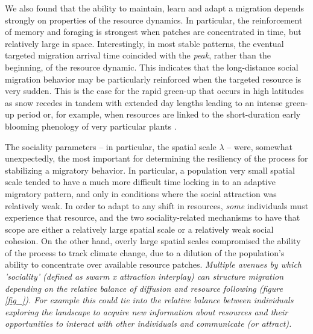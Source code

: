 \documentclass[utf8]{frontiersSCNS} %
\begin{document}
We also found that the ability to maintain, learn and adapt a migration depends strongly on properties of the resource dynamics. In particular, the reinforcement of memory and foraging is strongest when patches are concentrated in time, but relatively large in space. Interestingly, in most stable patterns, the eventual targeted migration arrival time coincided with the \emph{peak}, rather than the beginning, of the resource dynamic. This indicates that the long-distance social migration behavior may be particularly reinforced when the targeted resource is very sudden. This is the case for the rapid green-up that occurs in high latitudes as snow recedes in tandem with extended day lengths leading to an intense green-up period \citep{Park2020} or, for example, when resources are linked to the short-duration early blooming phenology of very particular plants \citep{Post2007}. 

The sociality parameters -- in particular, the spatial scale $\lambda$ -- were, somewhat unexpectedly, the most important for determining the resiliency of the process for stabilizing a migratory behavior. In particular, a population very small spatial scale tended to have a much more difficult time locking in to an adaptive migratory pattern, and only in conditions where the social attraction was relatively weak. In order to adapt to any shift in resources, \emph{some} individuals must experience that resource, and the two sociality-related mechanisms to have that scope are either a relatively large spatial scale or a relatively weak social cohesion. On the other hand, overly large spatial scales compromised the ability of the process to track climate change, due to a dilution of the population's ability to concentrate over available resource patches. \emph{Multiple avenues by which 'sociality' (defined as swarm x attraction interplay) can structure migration depending on the relative balance of diffusion and resource following (figure \ref{fig_}).   For example this could tie into the relative balance between individuals exploring the landscape to acquire new information about resources and their opportunities to interact with other individuals and communicate (or attract).}
\end{document}
